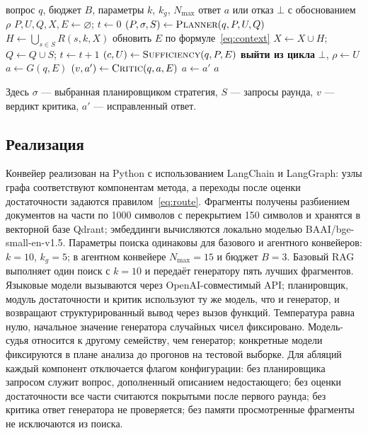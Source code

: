 \documentclass{misisarticle}
\begin{document}
\begin{algorithm}[t]
  \caption{Агентный цикл обработки вопроса}
  \label{alg:agentic}
  \small
  \begin{algorithmic}[1]
    \Require вопрос $q$, бюджет $B$, параметры $k$, $k_g$, $N_{\max}$
    \Ensure ответ $a$ или отказ $\bot$ с обоснованием $\rho$
    \State $P, U, Q, X, E \gets \varnothing$; $t \gets 0$
    \Loop
      \State $(P, \sigma, S) \gets \textsc{Planner}(q, P, U, Q)$
      \State $H \gets \bigcup_{s \in S} R(s, k, X)$
      \State обновить $E$ по формуле~\eqref{eq:context}
      \State $X \gets X \cup H$; $Q \gets Q \cup S$; $t \gets t + 1$
      \State $(c, U) \gets \textsc{Sufficiency}(q, P, E)$
       \textbf{выйти из цикла} \EndIf
       \Return $\bot$, $\rho \gets U$ \EndIf
    \EndLoop
    \State $a \gets G(q, E)$
    \State $(v, a') \gets \textsc{Critic}(q, a, E)$
     $a \gets a'$ \EndIf
    \State \Return $a$
  \end{algorithmic}
\end{algorithm}

Здесь $\sigma$ --- выбранная планировщиком стратегия, $S$ --- запросы раунда, $v$ --- вердикт критика, $a'$ --- исправленный ответ.

\subsection{Реализация}

Конвейер реализован на Python с использованием LangChain и LangGraph: узлы графа соответствуют компонентам метода, а переходы после оценки достаточности задаются правилом~\eqref{eq:route}.
Фрагменты получены разбиением документов на части по 1000 символов с перекрытием 150 символов и хранятся в векторной базе Qdrant; эмбеддинги вычисляются локально моделью BAAI/bge-small-en-v1.5.
Параметры поиска одинаковы для базового и агентного конвейеров: $k = 10$, $k_g = 5$; в агентном конвейере $N_{\max} = 15$ и бюджет $B = 3$.
Базовый RAG выполняет один поиск с $k = 10$ и передаёт генератору пять лучших фрагментов.
Языковые модели вызываются через OpenAI-совместимый API; планировщик, модуль достаточности и критик используют ту же модель, что и генератор, и возвращают структурированный вывод через вызов функций.
Температура равна нулю, начальное значение генератора случайных чисел фиксировано.
Модель-судья относится к другому семейству, чем генератор; конкретные модели фиксируются в плане анализа до прогонов на тестовой выборке.
Для абляций каждый компонент отключается флагом конфигурации: без планировщика запросом служит вопрос, дополненный описанием недостающего; без оценки достаточности все части считаются покрытыми после первого раунда; без критика ответ генератора не проверяется; без памяти просмотренные фрагменты не исключаются из поиска.
\end{document}
